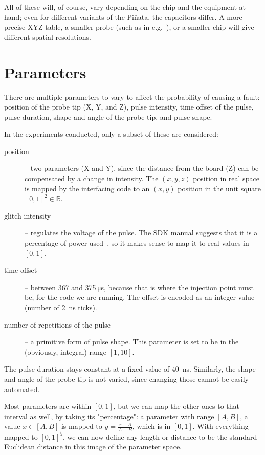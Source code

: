 \documentclass[times, utf8, diplomski]{fer}
\begin{document}
All of these will, of course, vary depending on the chip and the equipment at
hand; even for different variants of the Piñata, the capacitors differ.
A more precise XYZ table, a smaller probe (such as in e.g.~\cite{precise_probe_tips}),
or a smaller chip will give different spatial resolutions.


\section{Parameters}\label{sec:parameters}
There are multiple parameters to vary to affect the probability of causing a
fault: position of the probe tip (X, Y, and Z), pulse intensity, time offset
of the pulse, pulse duration, shape and angle of the probe tip, and pulse shape.

In the experiments conducted, only a subset of these are considered:
\begin{description}
  \item[position] -- two parameters (X and Y), since the distance from the board
        (Z) can be compensated by a change in intensity. The $(x,y,z)$ position
        in real space is mapped by the interfacing code to an $(x,y)$ position
        in the unit square $[0,1]^2 \in \mathbb{R}$.
  \item[glitch intensity] -- regulates the voltage of the pulse. The SDK manual
        suggests that it is a percentage of power used~\cite{RiscureVCGmanual},
        so it makes sense to map it to real values in $[0,1]$.
  \item[time offset] -- between 367 and 375\,\si{\micro\second}, because that is
        where the injection point must be, for the code we are running. The offset
        is encoded as an integer value (number of \SI{2}{\nano\second} ticks).
  \item[number of repetitions of the pulse] -- a primitive form of pulse shape.
        This parameter is set to be in the (obviously, integral) range $[1, 10]$.
\end{description}

The pulse duration stays constant at a fixed value of \SI{40}{\nano\second}.
Similarly, the shape and angle of the probe tip is not varied, since changing
those cannot be easily automated.

Most parameters are within $[0,1]$, but we can map the other ones to that
interval as well, by taking its "percentage": a parameter with range $[A,B]$,
a value $x \in [A,B]$ is mapped to $y = \frac{x-A}{A-B}$, which is in $[0,1]$.
With everything mapped to $[0,1]^5$, we can now define any length or distance
to be the standard Euclidean distance in this image of the parameter space.
\end{document}
